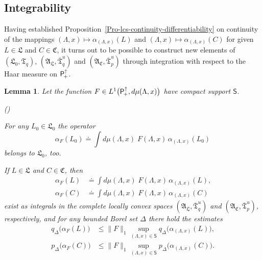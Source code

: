 \documentclass[11pt,twoside,openright]{report}
\theoremstyle{definition}
\theoremstyle{plain}
\newtheorem{Lem}[Def]{Lemma}
\theoremstyle{remark}
\theoremstyle{assumption}
\newcommand{\norm}[1]{\lVert #1 \rVert}
\newcommand{\bpDx}[1]{p_\Delta \bigl( #1 \bigr)}
\newcommand{\bqDx}[1]{q_\Delta \bigl( #1 \bigr)}
\newcommand{\Cfrak}{\mathfrak{C}}
\newcommand{\Lfrak}{\mathfrak{L}}
\newcommand{\Tfrak}{\mathfrak{T}}
\newcommand{\Ssf}{\mathsf{S}}
\newcommand{\Tfrakbar}{\overline{\mathfrak{T}}}
\newcommand{\AC}{\mathfrak{A}_\mathfrak{C}}
\newcommand{\AL}{\mathfrak{A}_\mathfrak{L}}
\newcommand{\Poin}{\mathsf{P}_{\negthinspace +}^\uparrow}
\newcommand{\aLax}{\alpha_{( \Lambda , x )}}
\newcounter{propitem}
\newenvironment{proplist}{\begin{list}{(\roman{propitem})}%
  {\usecounter{propitem} \setlength{\topsep}{0ex}%
   \setlength{\parsep}{0.2ex} \setlength{\itemsep}{0.4ex}%
   \setlength{\leftmargin}{0em} \setlength{\itemindent}{0.5em}%
   }}{\end{list}}
\begin{document}
\subsection{Integrability}
\label{subsec-integrability}

Having established
Proposition~\ref{Pro-lcs-continuity-differentiability} on continuity
of the mappings $( \Lambda , x ) \mapsto \aLax ( L )$ and $( \Lambda ,
x ) \mapsto \aLax ( C )$ for given $L \in \Lfrak$ and $C \in \Cfrak$,
it turns out to be possible to construct new elements of $( \Lfrak_0 ,
\Tfrak_q )$, $( \AL , \Tfrakbar^u_q )$ and $( \AC , \Tfrakbar^u_p )$
through integration with respect to the Haar measure on $\Poin$.
\begin{Lem}
  \label{Lem-Poin-Bochner-integrals}
  Let the function $F \in L^1 \bigl( \Poin , d \mu ( \Lambda , x )
  \bigr)$ have compact support $\Ssf$.
  \begin{proplist}
  \item For any $L_0 \in \Lfrak_0$ the operator
    \begin{equation}
      \label{eq-L0-integral}
      \alpha_F ( L_0 ) \doteq \int d \mu ( \Lambda , x ) \; F (
      \Lambda , x ) \, \aLax ( L_0 )
    \end{equation}
    belongs to $\Lfrak_0$, too.
  \item If $L \in \Lfrak$ and $C \in \Cfrak$, then
    \begin{subequations}
      \label{eq-LC-integral}
      \begin{align}
        \label{eq-L-integral}
        \alpha_F ( L ) & \doteq \int d \mu ( \Lambda , x ) \; F (
        \Lambda , x ) \, \aLax ( L ) \text{,} \\
        \label{eq-C-integral}
        \alpha_F ( C ) & \doteq \int d \mu ( \Lambda , x ) \; F (
        \Lambda , x ) \, \aLax ( C )
      \end{align}
    \end{subequations}
    exist as integrals in the complete locally convex spaces $( \AL ,
    \Tfrakbar^u_q )$ and $( \AC , \Tfrakbar^u_p )$, respectively, and
    for any bounded Borel set $\Delta$ there hold the estimates
    \begin{subequations}
      \label{eq-LC-integral-estimate}
      \begin{align}
        \label{eq-L-integral-estimate}
        \bqDx{\alpha_F ( L )} & \leqslant \norm{F}_1 \sup_{( \Lambda ,
        x ) \in \Ssf} \bqDx{\aLax ( L )} \text{,} \\
        \label{eq-C-integral-estimate}
        \bpDx{\alpha_F ( C )} & \leqslant \norm{F}_1 \sup_{( \Lambda ,
        x ) \in \Ssf} \bpDx{\aLax ( C )} \text{.}
      \end{align}
    \end{subequations}
  \end{proplist}
\end{Lem}
\end{document}
